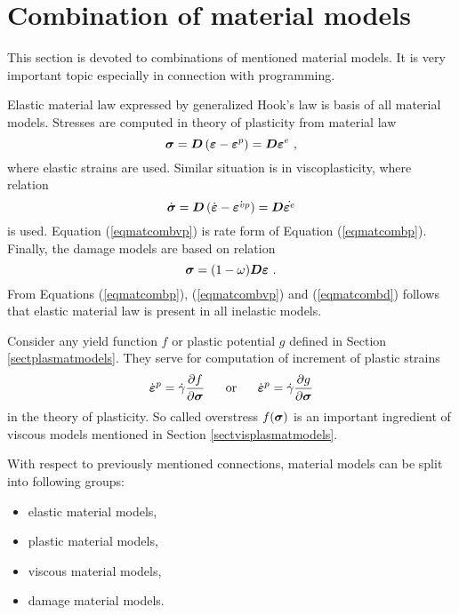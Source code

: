 \section{Combination of material models}
\label{sectmatmodcomb}

This section is devoted to combinations of mentioned material models. It is very important
topic especially in connection with programming.

Elastic material law expressed by generalized Hook's law is basis of all material models.
Stresses are computed in theory of plasticity from material law
\begin{equation}\label{eqmatcombp}
\mbox{\boldmath$\sigma$} = \mbox{\boldmath$D$} \left(\mbox{\boldmath$\varepsilon$}-\mbox{\boldmath$\varepsilon$}^{p}\right) = \mbox{\boldmath$D$} \mbox{\boldmath$\varepsilon$}^{e}\ ,
\end{equation}
where elastic strains are used. Similar situation is in viscoplasticity, where relation
\begin{equation}\label{eqmatcombvp}
\dot{\mbox{\boldmath$\sigma$}} = \mbox{\boldmath$D$} \left(\dot{\mbox{\boldmath$\varepsilon$}}-\dot{\mbox{\boldmath$\varepsilon$}^{vp}}\right) =
\mbox{\boldmath$D$} \dot{\mbox{\boldmath$\varepsilon$}^{e}}
\end{equation}
is used. Equation (\ref{eqmatcombvp}) is rate form of Equation (\ref{eqmatcombp}). Finally, the damage
models are based on relation
\begin{equation}\label{eqmatcombd}
\mbox{\boldmath$\sigma$} = (1-\omega) \mbox{\boldmath$D$} \mbox{\boldmath$\varepsilon$}\ .
\end{equation}
From Equations (\ref{eqmatcombp}), (\ref{eqmatcombvp}) and (\ref{eqmatcombd}) follows that elastic
material law is present in all inelastic models.

Consider any yield function $f$ or plastic potential $g$ defined in Section \ref{sectplasmatmodels}. They serve for
computation of increment of plastic strains
\begin{equation}
\dot{\mbox{\boldmath$\varepsilon$}}^{p} = \dot{\gamma} \mbox{$\displaystyle\frac{\partial{f}}{\partial{\mbox{\boldmath$\sigma$}}}$}\ \ \ \ \ {\rm or}\ \ \ \ \
\dot{\mbox{\boldmath$\varepsilon$}}^{p} = \dot{\gamma} \mbox{$\displaystyle\frac{\partial{g}}{\partial{\mbox{\boldmath$\sigma$}}}$}
\end{equation}
in the theory of plasticity. So called overstress $f(\mbox{\boldmath$\sigma$})$ is an important ingredient of viscous models
mentioned in Section \ref{sectvisplasmatmodels}.

With respect to previously mentioned connections, material models can be split into following groups:

\begin{itemize}
\item{elastic material models,}
\item{plastic material models,}
\item{viscous material models,}
\item{damage material models.}
\end{itemize}
